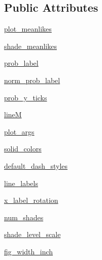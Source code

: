 \subsection*{Public Attributes}
\begin{DoxyCompactItemize}
\item 
\mbox{\hyperlink{classgetdist_1_1plots_1_1GetDistPlotSettings_a76c7b7803530a46d407cbefd7552427e}{plot\+\_\+meanlikes}}
\item 
\mbox{\hyperlink{classgetdist_1_1plots_1_1GetDistPlotSettings_a5266dbc65bcc1ffa54777c778686468a}{shade\+\_\+meanlikes}}
\item 
\mbox{\hyperlink{classgetdist_1_1plots_1_1GetDistPlotSettings_ae9216c95d766029231679e8afcb4d242}{prob\+\_\+label}}
\item 
\mbox{\hyperlink{classgetdist_1_1plots_1_1GetDistPlotSettings_a0eb9a20b8fcd803ca6c5268d1dbce67f}{norm\+\_\+prob\+\_\+label}}
\item 
\mbox{\hyperlink{classgetdist_1_1plots_1_1GetDistPlotSettings_ae94ed4ad233b54338140cc9db1882b82}{prob\+\_\+y\+\_\+ticks}}
\item 
\mbox{\hyperlink{classgetdist_1_1plots_1_1GetDistPlotSettings_ae8c9555577b4e03dc8b6e04e0ea07ace}{lineM}}
\item 
\mbox{\hyperlink{classgetdist_1_1plots_1_1GetDistPlotSettings_af1a77e07e0819ba542599f393b7f536c}{plot\+\_\+args}}
\item 
\mbox{\hyperlink{classgetdist_1_1plots_1_1GetDistPlotSettings_a2156488cc86e015b4fde2c2c8a5c0f18}{solid\+\_\+colors}}
\item 
\mbox{\hyperlink{classgetdist_1_1plots_1_1GetDistPlotSettings_a6a5e100b8265a46a016c698b16539218}{default\+\_\+dash\+\_\+styles}}
\item 
\mbox{\hyperlink{classgetdist_1_1plots_1_1GetDistPlotSettings_a02eeb03f78aeb85ef1f4b11608ece8f3}{line\+\_\+labels}}
\item 
\mbox{\hyperlink{classgetdist_1_1plots_1_1GetDistPlotSettings_acee8ce5af289ad17756f6a7142f63b9c}{x\+\_\+label\+\_\+rotation}}
\item 
\mbox{\hyperlink{classgetdist_1_1plots_1_1GetDistPlotSettings_a2ad5db9126e8526bde5b07146ceba70b}{num\+\_\+shades}}
\item 
\mbox{\hyperlink{classgetdist_1_1plots_1_1GetDistPlotSettings_af64d3cf5bbad729e7ad89813f15bbff1}{shade\+\_\+level\+\_\+scale}}
\item 
\mbox{\hyperlink{classgetdist_1_1plots_1_1GetDistPlotSettings_a81f8a6c1c2d6786381c889a6df53c497}{fig\+\_\+width\+\_\+inch}}
\item 

\end{DoxyCompactItemize}
